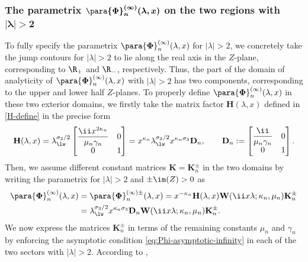 \subsubsection[The parametrix Phi\_n\^infty(lambda,x) on the two regions with |lambda|>2]{The parametrix $\boldsymbol{\para{\mathbf{\Phi}}_n^{(\infty)}(\lambda,x)}$ on the two regions with $\boldsymbol{|\lambda|>2}$}
To fully specify the parametrix $\para{\boldsymbol{\Phi}}_n^{(\infty)}(\lambda,x)$ for $|\lambda|>2$, we concretely take the jump contours for $|\lambda|>2$ to lie along the real axis in the $Z$-plane, corresponding to $\R_+$ and $\R_-$, respectively. Thus, the part of the domain of analyticity of $\para{\boldsymbol\Phi}_n^{(\infty)}(\lambda,x)$ with $|\lambda|>2$ has two components, corresponding to the upper and lower half $Z$-planes. To properly define $\para{\boldsymbol{\Phi}}_n^{(\infty)}(\lambda,x)$ in these two exterior domains, we firstly take the matrix factor $\mathbf{H}(\lambda,x)$ defined in \eqref{H-define} in the precise form
\begin{equation}
 \mathbf{H}(\lambda,x)=\lambda_{\lw}^{\sigma_3/2}\begin{bmatrix}\displaystyle \frac{\ii x^{2\kappa_n}}{\mu_n \gamma_n} & 0\\0 & 1
 \end{bmatrix} = x^{\kappa_n}\lambda_{\lw}^{\sigma_3/2}x^{\kappa_n\sigma_3}\mathbf{D}_n,\qquad\mathbf{D}_n:=\begin{bmatrix}\displaystyle\frac{\ii}{\mu_n\gamma_n} & 0\\0 & 1\end{bmatrix}.
 \label{H-define-2}
\end{equation}
Then, we assume different constant matrices $\mathbf{K}=\mathbf{K}_n^\pm$ in the two domains by writing the parametrix for $|\lambda|>2$ and $\pm\im(Z)> 0$ as
\begin{align}
 &\para{\boldsymbol{\Phi}}_n^{(\infty)}(\lambda,x)=\para{\boldsymbol{\Phi}}_n^{(\infty)\pm}(\lambda,x)=x^{-\kappa_n}\mathbf{H}(\lambda,x)\mathbf{W}(\ii x\lambda;\kappa_n,\mu_n)\mathbf{K}_n^\pm \nonumber\\&\phantom{\para{\boldsymbol{\Phi}}_n^{(\infty)}(\lambda,x)}{}= \lambda_{\lw}^{\sigma_3/2}x^{\kappa_n\sigma_3}\mathbf{D}_n\mathbf{W}(\ii x\lambda;\kappa_n,\mu_n)\mathbf{K}_n^\pm.
 \label{infinity-parametrix-form}
\end{align}
We now express the matrices $\mathbf{K}_n^\pm$ in terms of the remaining constants $\mu_n$ and $\gamma_n$ by enforcing the asymptotic condition \eqref{eq:Phi-asymptotic-infinity} in each of the two sectors with $|\lambda|>2$. According to \cite[equation~(13.19.3)]{DLMF},
